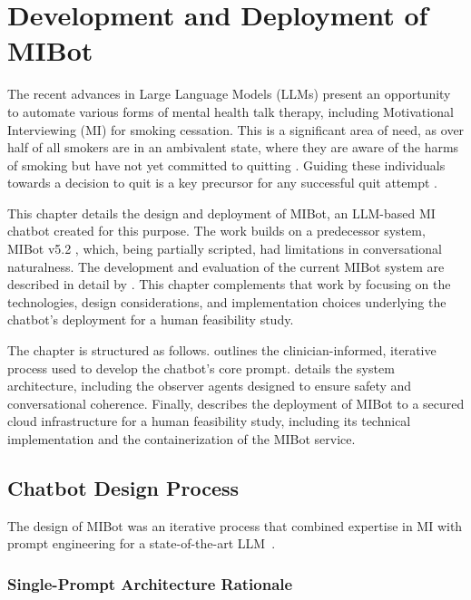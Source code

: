 \chapter{Development and Deployment of MIBot}
\label{ch:mibot}

The recent advances in Large Language Models (LLMs) present an opportunity to automate various forms of mental health talk therapy, including Motivational Interviewing (MI) for smoking cessation. This is a significant area of need, as over half of all smokers are in an ambivalent state, where they are aware of the harms of smoking but have not yet committed to quitting \citep{Babb2017}. Guiding these individuals towards a decision to quit is a key precursor for any successful quit attempt \citep{West2006}.

This chapter details the design and deployment of MIBot, an LLM-based MI chatbot created for this purpose. The work builds on a predecessor system, MIBot v5.2 \citep{brown2023mi}, which, being partially scripted, had limitations in conversational naturalness. The development and evaluation of the current MIBot system are described in detail by \citet{mahmood-etal-2025-fully}. This chapter complements that work by focusing on the technologies, design considerations, and implementation choices underlying the chatbot's deployment for a human feasibility study.

The chapter is structured as follows.  outlines the clinician-informed, iterative process used to develop the chatbot's core prompt.  details the system architecture, including the observer agents designed to ensure safety and conversational coherence. Finally,  describes the deployment of MIBot to a secured cloud infrastructure for a human feasibility study, including its technical implementation and the containerization of the MIBot service.




\section{Chatbot Design Process}
\label{sec:iterative-development}

The design of MIBot was an iterative process that combined expertise in MI with prompt engineering for a state-of-the-art LLM~\citep{openai2024gpt4ocard}.

\subsection{Single-Prompt Architecture Rationale}
\label{sec:single-prompt-rationale}

